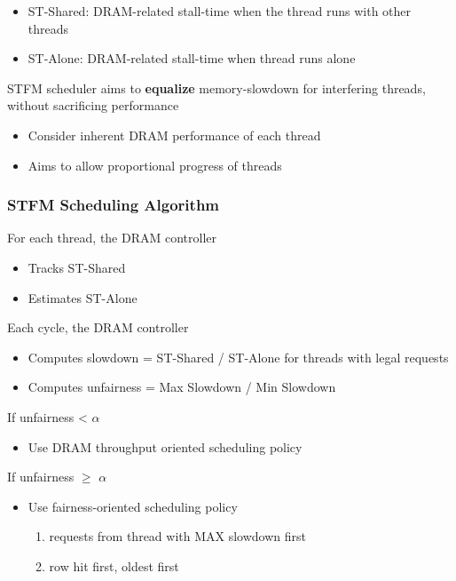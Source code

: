 \documentclass[]{article}
\providecommand{\tightlist}{%
  \setlength{\itemsep}{0pt}\setlength{\parskip}{0pt}}
\begin{document}
\begin{itemize}
\tightlist
\item
  ST-Shared: DRAM-related stall-time when the thread runs with other
  threads
\item
  ST-Alone: DRAM-related stall-time when thread runs alone
\end{itemize}

STFM scheduler aims to \textbf{equalize} memory-slowdown for interfering
threads, without sacrificing performance

\begin{itemize}
\tightlist
\item
  Consider inherent DRAM performance of each thread
\item
  Aims to allow proportional progress of threads
\end{itemize}

\hypertarget{stfm-scheduling-algorithm}{%
\subsubsection{STFM Scheduling
Algorithm}\label{stfm-scheduling-algorithm}}

For each thread, the DRAM controller

\begin{itemize}
\tightlist
\item
  Tracks ST-Shared
\item
  Estimates ST-Alone
\end{itemize}

Each cycle, the DRAM controller

\begin{itemize}
\tightlist
\item
  Computes slowdown = ST-Shared / ST-Alone for threads with legal
  requests
\item
  Computes unfairness = Max Slowdown / Min Slowdown
\end{itemize}

If unfairness \textless{} \(\alpha\)

\begin{itemize}
\tightlist
\item
  Use DRAM throughput oriented scheduling policy
\end{itemize}

If unfairness \(\ge\) \(\alpha\)

\begin{itemize}
\tightlist
\item
  Use fairness-oriented scheduling policy

  \begin{enumerate}
  \def\labelenumi{\arabic{enumi}.}
  \tightlist
  \item
    requests from thread with MAX slowdown first
  \item
    row hit first, oldest first
  \end{enumerate}
\end{itemize}
\end{document}
